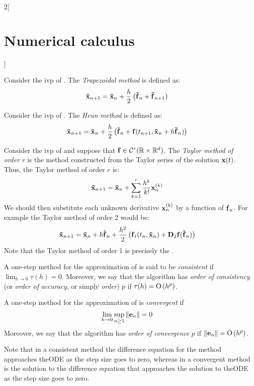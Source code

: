 \documentclass[../../../main_math.tex]{subfiles}
\begin{document}
\begin{multicols}{2}[\section{Numerical calculus}]
\begin{figure}[H]
    \label{NC:euler_fig}
  \end{figure}
  \begin{definition}
    Consider the ivp of . The \emph{Trapezoidal method} is defined as:
    $$\boldsymbol{\mathrm{\tilde{x}}}_{n+1}=\boldsymbol{\mathrm{\tilde{x}}}_{n}+\frac{h}{2}\left(\boldsymbol{\mathrm{\tilde{f}}}_n+\boldsymbol{\mathrm{\tilde{f}}}_{n+1}\right)$$
  \end{definition}
  \begin{definition}
    Consider the ivp of . The \emph{Heun method} is defined as:
    $$\boldsymbol{\mathrm{\tilde{x}}}_{n+1}=\boldsymbol{\mathrm{\tilde{x}}}_{n}+\frac{h}{2}\left(\boldsymbol{\mathrm{\tilde{f}}}_n+\boldsymbol{\mathrm{f}}(t_{n+1},\boldsymbol{\mathrm{\tilde{x}}}_{n}+h\boldsymbol{\mathrm{\tilde{f}}}_n)\right)$$
  \end{definition}
  \begin{definition}
    Consider the ivp of  and suppose that $\boldsymbol{\mathrm{f}}\in\mathcal{C}^r(\mathbb{R}\times\mathbb{R}^d)$. The \emph{Taylor method of order $r$} is the method constructed from the Taylor series of the solution $\boldsymbol{\mathrm{x}}(t)$. Thus, the Taylor method of order $r$ is:
    $$\boldsymbol{\mathrm{\tilde{x}}}_{n+1}=\boldsymbol{\mathrm{\tilde{x}}}_{n}+\sum_{k=1}^r\frac{h^k}{k!}\boldsymbol{\mathrm{x}}_n^{(k)}$$
    We should then substitute each unknown derivative $\boldsymbol{\mathrm{x}}_n^{(k)}$ by a function of $\boldsymbol{\mathrm{f}}_n$.
    For example the Taylor method of order 2 would be:
    $$\boldsymbol{\mathrm{\tilde{x}}}_{n+1}=\boldsymbol{\mathrm{\tilde{x}}}_{n}+h\boldsymbol{\mathrm{\tilde{f}}}_n+\frac{h^2}{2}\left(\boldsymbol{\mathrm{{f}}}_t(t_n,\boldsymbol{\mathrm{\tilde{x}}}_{n})+\boldsymbol{\mathrm{D}}_2\boldsymbol{\mathrm{f}}(\boldsymbol{\mathrm{\tilde{f}}}_n)\right)$$
    Note that the Taylor method of order 1 is precisely the .
  \end{definition}
  \begin{definition}
    A one-step method for the approximation of  is said to be \emph{consistent} if $\displaystyle\lim_{h\to 0}\tau(h)=0$. Moreover, we say that the algorithm has \emph{order of consistency} (or \emph{order of accuracy}, or simply \emph{order}) $p$ if $\tau(h)=\mathrm{O}\left(h^p\right)$.
  \end{definition}
  \begin{definition}
    A one-step method for the approximation of  is \emph{convergent} if $$\lim_{h\to 0}\sup_{n\geq 1}\left\|\boldsymbol{\mathrm{e}}_n\right\|=0$$
    Moreover, we say that the algorithm has \emph{order of convergence} $p$ if $\left\|\boldsymbol{\mathrm{e}}_n\right\|=\mathrm{O}\left(h^p\right)$.
  \end{definition}
  \begin{remark}
    Note that in a consistent method the difference equation for the method approaches theODE as the step size goes to zero, whereas in a convergent method is the solution to the difference equation that approaches the solution to theODE as the step size goes to zero.

\end{remark}
\end{multicols}
\end{document}
